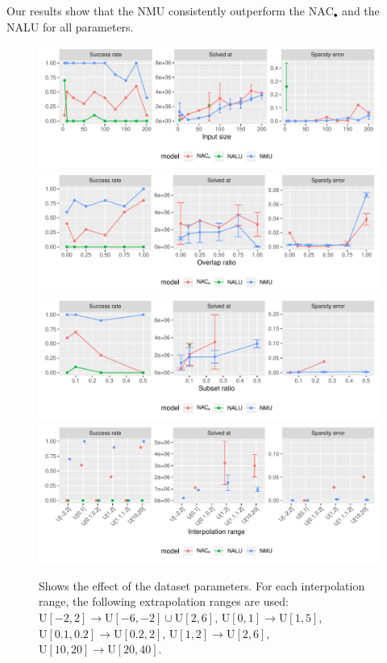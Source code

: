 Our results show that the NMU consistently outperform the $\mathrm{NAC}_{\bullet}$ and the NALU for all parameters.

\begin{figure}[h]
\centering
\includegraphics[width=\linewidth,trim={0 1.3cm 0 0},clip]{results/simple_function_static_input_size.pdf}
\includegraphics[width=\linewidth,trim={0 1.3cm 0 0.809cm},clip]{results/simple_function_static_overlap.pdf}
\includegraphics[width=\linewidth,trim={0 1.3cm 0 0.809cm},clip]{results/simple_function_static_subset.pdf}
\includegraphics[width=\linewidth,trim={0 0 0 0.809cm},clip]{results/simple_function_static_range.pdf}
\caption{Shows the effect of the dataset parameters. For each interpolation range, the following extrapolation ranges are used: ${\mathrm{U}[-2,2] \rightarrow \mathrm{U}[-6,-2] \cup \mathrm{U}[2,6]}$, ${\mathrm{U}[0,1] \rightarrow \mathrm{U}[1,5]}$, ${\mathrm{U}[0.1,0.2] \rightarrow \mathrm{U}[0.2,2]}$, ${\mathrm{U}[1,2] \rightarrow \mathrm{U}[2,6]}$, ${\mathrm{U}[10, 20] \rightarrow \mathrm{U}[20, 40]}$.}
\label{fig:simple-function-static-boundary}
\end{figure}

